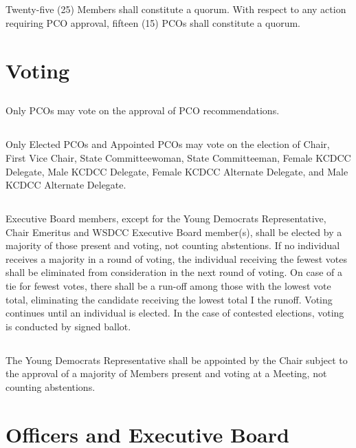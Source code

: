 \subsection{}
Twenty-five (25) Members shall constitute a quorum. With respect to any action requiring PCO approval, fifteen (15) PCOs shall constitute a quorum.

\section{Voting}
\subsection{}
Only PCOs may vote on the approval of PCO recommendations.

\subsection{}
Only Elected PCOs and Appointed PCOs may vote on the election of Chair, First Vice Chair, State Committeewoman, State Committeeman, Female KCDCC Delegate, Male KCDCC Delegate, Female KCDCC Alternate Delegate, and Male KCDCC Alternate Delegate.

\subsection{}
Executive Board members, except for the Young Democrats Representative, Chair Emeritus and WSDCC Executive Board member(s), shall be elected by a majority of those present and voting, not counting abstentions. If no individual receives a majority in a round of voting, the individual receiving the fewest votes shall be eliminated from consideration in the next round of voting. On case of a tie for fewest votes, there shall be a run-off among those with the lowest vote total, eliminating the candidate receiving the lowest total I the runoff.  Voting continues until an individual is elected. In the case of contested elections, voting is conducted by signed ballot.

\subsection{}
The Young Democrats Representative shall be appointed by the Chair subject to the approval of a majority of Members present and voting at a Meeting, not counting abstentions.

\section{Officers and Executive Board}
